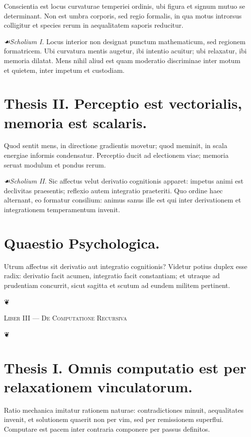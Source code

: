 \documentclass[12pt]{article}
\newcommand{\florale}{\centerline{\large ❦}}
\newcommand{\scholia}{\textit{☙\;}}
\newcommand{\divider}{\vspace{1em}\florale\vspace{1em}}
\newcommand{\Liber}[1]{\vspace{1ex}\begin{center}\Large\textsc{Liber #1}\end{center}\vspace{-0.5ex}\florale\vspace{0.5ex}}
\begin{document}
Conscientia est locus curvaturae temperiei ordinis, ubi figura et signum mutuo se determinant. Non est umbra corporis, sed regio formalis, in qua motus introrsus colligitur et species rerum in aequalitatem saporis reducitur.

\textit{\scholia Scholium I.} Locus interior non designat punctum mathematicum, sed regionem formatricem. Ubi curvatura mentis augetur, ibi intentio acuitur; ubi relaxatur, ibi memoria dilatat. Mens nihil aliud est quam moderatio discriminae inter motum et quietem, inter impetum et custodiam.

\section*{Thesis II. \; Perceptio est vectorialis, memoria est scalaris.}

Quod sentit mens, in directione gradientis movetur; quod meminit, in scala energiae informis condensatur. Perceptio ducit ad electionem viae; memoria seruat modulum et pondus rerum.

\textit{\scholia Scholium II.} Sic affectus velut derivatio cognitionis apparet: impetus animi est declivitas praesentis; reflexio autem integratio praeteriti. Quo ordine haec alternant, eo formatur consilium: animus sanus ille est qui inter derivationem et integrationem temperamentum invenit.

\section*{Quaestio Psychologica.}

Utrum affectus sit derivatio aut integratio cognitionis? Videtur potius duplex esse radix: derivatio facit acumen, integratio facit constantiam; et utraque ad prudentiam concurrit, sicut sagitta et scutum ad eundem militem pertinent.

\divider

\Liber{III — De Computatione Recursiva}

\section*{Thesis I. \; Omnis computatio est per relaxationem vinculatorum.}

Ratio mechanica imitatur rationem naturae: contradictiones minuit, aequalitates invenit, et solutionem quaerit non per vim, sed per remissionem superflui. Computare est pacem inter contraria componere per passus definitos.
\end{document}
